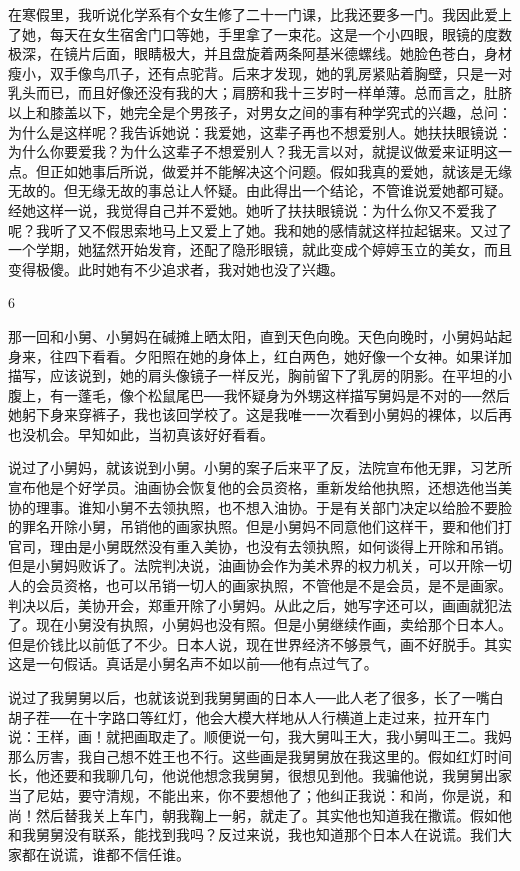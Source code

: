 在寒假里，我听说化学系有个女生修了二十一门课，比我还要多一门。我因此爱上了她，每天在女生宿舍门口等她，手里拿了一束花。这是一个小四眼，眼镜的度数极深，在镜片后面，眼睛极大，并且盘旋着两条阿基米德螺线。她脸色苍白，身材瘦小，双手像鸟爪子，还有点驼背。后来才发现，她的乳房紧贴着胸壁，只是一对乳头而已，而且好像还没有我的大；肩膀和我十三岁时一样单薄。总而言之，肚脐以上和膝盖以下，她完全是个男孩子，对男女之间的事有种学究式的兴趣，总问：为什么是这样呢？我告诉她说：我爱她，这辈子再也不想爱别人。她扶扶眼镜说：为什么你要爱我？为什么这辈子不想爱别人？我无言以对，就提议做爱来证明这一点。但正如她事后所说，做爱并不能解决这个问题。假如我真的爱她，就该是无缘无故的。但无缘无故的事总让人怀疑。由此得出一个结论，不管谁说爱她都可疑。经她这样一说，我觉得自己并不爱她。她听了扶扶眼镜说：为什么你又不爱我了呢？我听了又不假思索地马上又爱上了她。我和她的感情就这样拉起锯来。又过了一个学期，她猛然开始发育，还配了隐形眼镜，就此变成个婷婷玉立的美女，而且变得极傻。此时她有不少追求者，我对她也没了兴趣。

6 

那一回和小舅、小舅妈在碱摊上晒太阳，直到天色向晚。天色向晚时，小舅妈站起身来，往四下看看。夕阳照在她的身体上，红白两色，她好像一个女神。如果详加描写，应该说到，她的肩头像镜子一样反光，胸前留下了乳房的阴影。在平坦的小腹上，有一蓬毛，像个松鼠尾巴──我怀疑身为外甥这样描写舅妈是不对的──然后她躬下身来穿裤子，我也该回学校了。这是我唯一一次看到小舅妈的裸体，以后再也没机会。早知如此，当初真该好好看看。 

说过了小舅妈，就该说到小舅。小舅的案子后来平了反，法院宣布他无罪，习艺所宣布他是个好学员。油画协会恢复他的会员资格，重新发给他执照，还想选他当美协的理事。谁知小舅不去领执照，也不想入油协。于是有关部门决定以给脸不要脸的罪名开除小舅，吊销他的画家执照。但是小舅妈不同意他们这样干，要和他们打官司，理由是小舅既然没有重入美协，也没有去领执照，如何谈得上开除和吊销。但是小舅妈败诉了。法院判决说，油画协会作为美术界的权力机关，可以开除一切人的会员资格，也可以吊销一切人的画家执照，不管他是不是会员，是不是画家。判决以后，美协开会，郑重开除了小舅妈。从此之后，她写字还可以，画画就犯法了。现在小舅没有执照，小舅妈也没有照。但是小舅继续作画，卖给那个日本人。但是价钱比以前低了不少。日本人说，现在世界经济不够景气，画不好脱手。其实这是一句假话。真话是小舅名声不如以前──他有点过气了。 

说过了我舅舅以后，也就该说到我舅舅画的日本人──此人老了很多，长了一嘴白胡子茬──在十字路口等红灯，他会大模大样地从人行横道上走过来，拉开车门说：王样，画！就把画取走了。顺便说一句，我大舅叫王大，我小舅叫王二。我妈那么厉害，我自己想不姓王也不行。这些画是我舅舅放在我这里的。假如红灯时间长，他还要和我聊几句，他说他想念我舅舅，很想见到他。我骗他说，我舅舅出家当了尼姑，要守清规，不能出来，你不要想他了；他纠正我说：和尚，你是说，和尚！然后替我关上车门，朝我鞠上一躬，就走了。其实他也知道我在撒谎。假如他和我舅舅没有联系，能找到我吗？反过来说，我也知道那个日本人在说谎。我们大家都在说谎，谁都不信任谁。 

